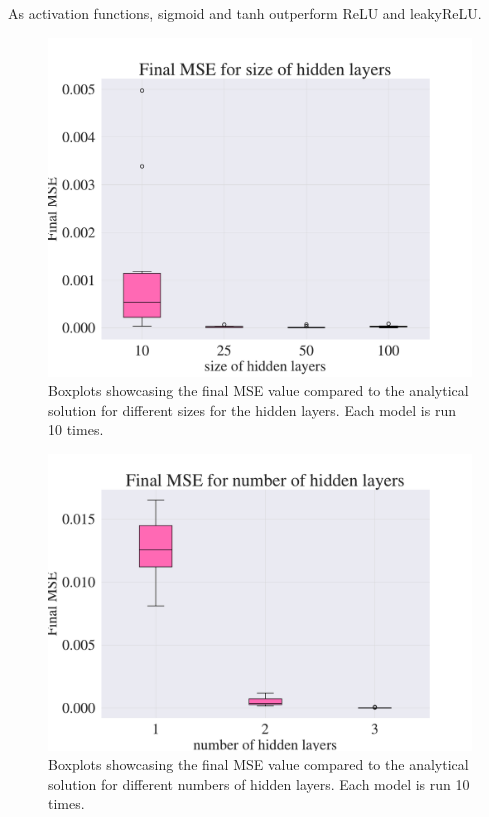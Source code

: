 As activation functions, sigmoid and tanh outperform ReLU and leakyReLU. 

\begin{figure}[h!]
    \centering
    \includegraphics[width=1.0\linewidth]{project_3/plots/value_layers_search.pdf}
    \caption{Boxplots showcasing the final MSE value compared to the analytical solution for different sizes for the hidden layers. Each model is run 10 times. }
    \label{fig:boxplots_size_of_layers}
\end{figure}


\begin{figure}[h!]
    \centering
    \includegraphics[width=1.0\linewidth]{project_3/plots/n_layers_search.pdf}
    \caption{Boxplots showcasing the final MSE value compared to the analytical solution for different numbers of hidden layers. Each model is run 10 times.}
    \label{fig:boxplots_number_of_hidden_layers}
\end{figure}
